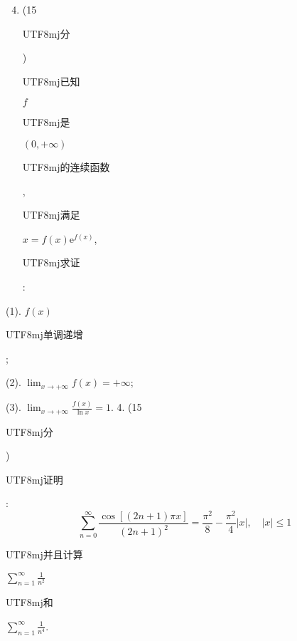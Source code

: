 \documentclass[10pt]{article}
\begin{document}
\begin{enumerate}
  \setcounter{enumi}{3}
  \item (15 \begin{CJK}{UTF8}{mj}分\end{CJK}) \begin{CJK}{UTF8}{mj}已知\end{CJK} $f$ \begin{CJK}{UTF8}{mj}是\end{CJK} $(0,+\infty)$ \begin{CJK}{UTF8}{mj}的连续函数\end{CJK}, \begin{CJK}{UTF8}{mj}满足\end{CJK} $x=f(x) \mathrm{e}^{f(x)}$, \begin{CJK}{UTF8}{mj}求证\end{CJK}:
\end{enumerate}
(1). $f(x)$ \begin{CJK}{UTF8}{mj}单调递增\end{CJK};

(2). $\lim _{x \rightarrow+\infty} f(x)=+\infty$;

(3). $\lim _{x \rightarrow+\infty} \frac{f(x)}{\ln x}=1$. 4. (15 \begin{CJK}{UTF8}{mj}分\end{CJK}) \begin{CJK}{UTF8}{mj}证明\end{CJK}:
$$
\sum_{n=0}^{\infty} \frac{\cos [(2 n+1) \pi x]}{(2 n+1)^{2}}=\frac{\pi^{2}}{8}-\frac{\pi^{2}}{4}|x|, \quad|x| \leq 1
$$
\begin{CJK}{UTF8}{mj}并且计算\end{CJK} $\sum_{n=1}^{\infty} \frac{1}{n^{2}}$ \begin{CJK}{UTF8}{mj}和\end{CJK} $\sum_{n=1}^{\infty} \frac{1}{n^{4}}$.
\end{document}
